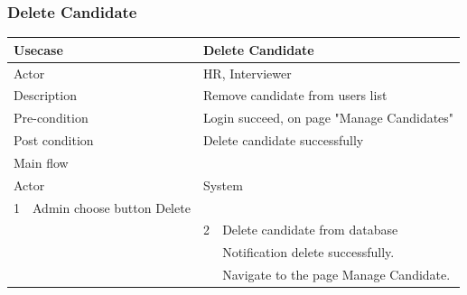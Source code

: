 \documentclass[a4paper]{article}
\begin{document}
\subsubsection{Delete Candidate}
\begin{center}
\begin{tabular}{|l|p{5cm}||l|p{5cm}|}
	\hline 
	\multicolumn{2}{|p{5cm}|}{Usecase} & \multicolumn{2}{|p{5cm}|}{Delete Candidate}\\ 
	\hline 
	\multicolumn{2}{|p{5cm}|}{Actor} & \multicolumn{2}{|p{5cm}|}{HR, Interviewer} \\ 
	\hline 
	\multicolumn{2}{|p{5cm}|}{Description} & \multicolumn{2}{|p{5cm}|}{Remove candidate from users list}\\
	\hline
	\multicolumn{2}{|p{5cm}|}{Pre-condition} & \multicolumn{2}{|p{5cm}|}{Login succeed, on page "Manage Candidates"}\\
	\hline
	\multicolumn{2}{|p{5cm}|}{Post condition} & \multicolumn{2}{|p{5cm}|}{Delete candidate successfully} \\
	\hline
	\multicolumn{4}{|l|}{Main flow} \\
	\hline
	\multicolumn{2}{|p{5cm}|}{Actor} & \multicolumn{2}{|p{5cm}|}{System} \\
	\hline
	1 & Admin choose button Delete & & \\
	\hline
	& & 2 & Delete candidate from database \\
	& &  &Notification delete successfully.\\
	& & &Navigate to the page Manage Candidate. \\	
	\hline 	
\end{tabular}
\end{center}
\end{document}
